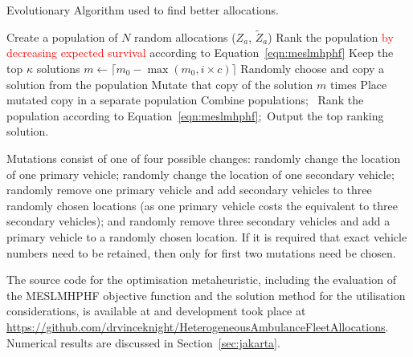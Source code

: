 \documentclass[numbers,webpdf,imaman]{ima-authoring-template}%
\begin{document}
\begin{algorithm}
\algnewcommand{}
\caption{Evolutionary Algorithm used to find better allocations.}
\label{alg:heuristic}
\begin{algorithmic}[1]
\State Create a population of $N$ random allocations ($Z_a$, $\tilde{Z}_a$)\;
  \State Rank the population \textcolor{red}{by decreasing expected survival} according to Equation~\ref{eqn:meslmhphf}\;
  \State Keep the top $\kappa$ solutions\;
  \State $m \leftarrow \lceil m_0 - \max\left(m_0, i \times c\right)\rceil$\;
    \State Randomly choose and copy a solution from the population\;
    \State Mutate that copy of the solution $m$ times\;
    \State Place mutated copy in a separate population\;
  \EndFor
  \State Combine populations;\
\EndFor
\State Rank the population according to Equation~\ref{eqn:meslmhphf};\
\State Output the top ranking solution.
\end{algorithmic}
\end{algorithm}

Mutations consist of one of four possible changes: randomly change the location
of one primary vehicle; randomly change the location of one secondary vehicle;
randomly remove one primary vehicle and add secondary vehicles to three randomly
chosen locations (as one primary vehicle costs the equivalent to three secondary
vehicles); and randomly remove three secondary vehicles and add a primary
vehicle to a randomly chosen location. If it is required that exact vehicle
numbers need to be retained, then only for first two mutations need be chosen.

The source code for the optimisation metaheuristic, including the evaluation of
the MESLMHPHF objective function and the solution method for the utilisation
considerations, is available at \citet{zenodo_opt} and development took place at
\url{https://github.com/drvinceknight/HeterogeneousAmbulanceFleetAllocations}.
Numerical results are discussed in Section~\ref{sec:jakarta}.
\end{document}
